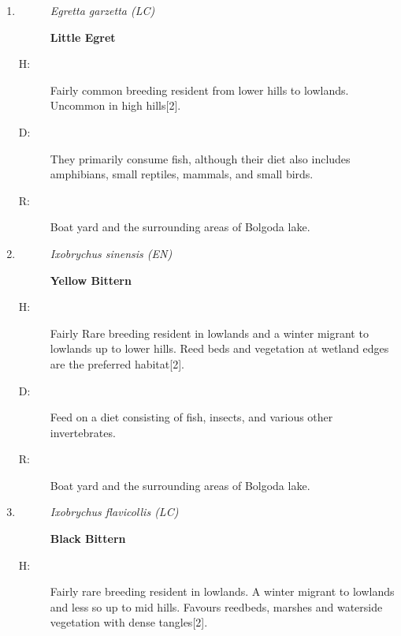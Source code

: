 \begin{itemize}
\begin{enumerate}
\begin{description}
\item[D: ]%
Primary diet consists of large insects such as grasshoppers, crickets, and flies. They may also include frogs, spiders, moths in their diet.%
\item[R: ]%
University playground premises and the Boat yard.%
\end{description}%
\item%
\begin{description}%
\item[]%
\textit{Egretta garzetta (LC)}%
\item[]%
\textbf{Little Egret}%
\end{description}%
\begin{description}%
\item[H: ]%
Fairly common breeding resident from lower hills to lowlands. Uncommon in high hills{[}2{]}.%
\item[D: ]%
They primarily consume fish, although their diet also includes amphibians, small reptiles, mammals, and small birds.%
\item[R: ]%
Boat yard and the surrounding areas of Bolgoda lake.%
\end{description}%
\item%
\begin{description}%
\item[]%
\textit{Ixobrychus sinensis (EN)}%
\item[]%
\textbf{Yellow Bittern}%
\end{description}%
\begin{description}%
\item[H: ]%
Fairly Rare breeding resident in lowlands and a winter migrant to lowlands up to lower hills. Reed beds and vegetation at wetland edges are the preferred habitat{[}2{]}.%
\item[D: ]%
Feed on a diet consisting of fish, insects, and various other invertebrates.%
\item[R: ]%
Boat yard and the surrounding areas of Bolgoda lake.%
\end{description}%
\item%
\begin{description}%
\item[]%
\textit{Ixobrychus flavicollis (LC)}%
\item[]%
\textbf{Black Bittern}%
\end{description}%
\begin{description}%
\item[H: ]%
Fairly rare breeding resident in lowlands. A winter migrant to lowlands and less so up to mid hills. Favours reedbeds, marshes and waterside vegetation with dense tangles{[}2{]}.%

\end{description}
\end{enumerate}
\end{itemize}
